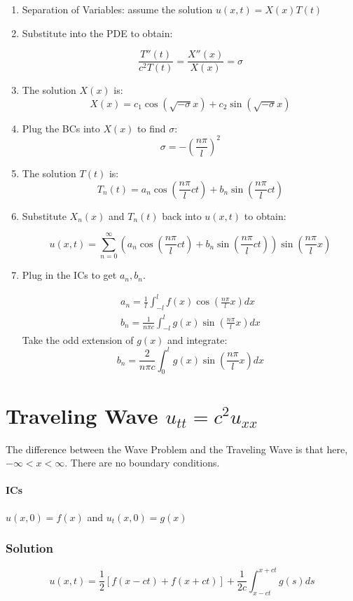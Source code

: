 \documentclass[11pt]{article}
\begin{document}
\begin{enumerate}

\item Separation of Variables: assume the solution $u(x,t) = X(x)T(t)$
\item Substitute into the PDE to obtain:

$$ \frac{T''(t)}{c^2T(t)} = \frac{X''(x)}{X(x)} = \sigma $$

\item The solution $X(x)$ is:
$$ X(x) = c_1\cos(\sqrt{-\sigma}x) + c_2\sin(\sqrt{-\sigma}x) $$

\item Plug the BCs into $X(x)$ to find $\sigma$:
$$ \sigma = -(\frac{n\pi}{l})^2 $$

\item The solution $T(t)$ is:
$$ T_n(t) = a_n\cos(\frac{n\pi}{l}ct) + b_n\sin(\frac{n\pi}{l}ct) $$

\item Substitute $X_n(x)$ and $T_n(t)$ back into $u(x,t)$ to obtain:

$$ u(x,t) = \sum \limits_{n=0}^{\infty} \left( a_n\cos(\frac{n\pi}{l}ct) + b_n\sin(\frac{n\pi}{l}ct) \right) \sin(\frac{n\pi}{l}x)$$

\item Plug in the ICs to get $a_n, b_n$.

\begin{gather*}
a_n = \frac{1}{l} \int_{-l}^{l} f(x) \cos(\frac{n\pi}{l}x) dx \\
b_n = \frac{1}{n\pi c} \int_{-l}^{l} g(x) \sin(\frac{n\pi}{l}x) dx
\end{gather*}
Take the odd extension of $g(x)$ and integrate:
$$
b_n = \frac{2}{n\pi c} \int_{0}^{l} g(x) \sin(\frac{n\pi}{l}x) dx
$$
\end{enumerate}



\section{Traveling Wave $u_{tt}=c^2u_{xx}$}
The difference between the Wave Problem and the Traveling Wave is that here, $-\infty<x<\infty$. There are no boundary conditions.
\paragraph{ICs} $u(x,0) = f(x)$ and $u_t(x,0) = g(x)$

\subsubsection*{Solution}
$$u(x,t) = \frac{1}{2} [ f(x-ct) + f(x+ct)] + \frac{1}{2c} \int_{x-ct}^{x+ct} g(s) ds $$
\end{document}
